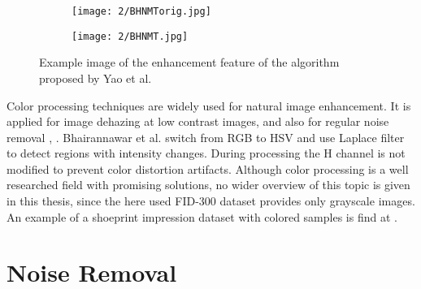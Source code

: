 \documentclass[draft,final]{vutinfth} %
\begin{document}
\begin{figure}[h]
  \centering
  \begin{subfigure}[t]{0.4\columnwidth}
    \centering
    \texttt{[image: 2/BHNMTorig.jpg]}
    \label{fig:rw:BHNMTin}
  \end{subfigure}
  \begin{subfigure}[t]{0.4\columnwidth}
    \centering
    \texttt{[image: 2/BHNMT.jpg]}
    \label{fig:rw:BHNMTout}
  \end{subfigure}
  \caption{Example image of the enhancement feature of the algorithm proposed by Yao et al. \cite{yao2016image} }
  \label{fig:rw:BHNMT} %
\end{figure}

\par
Color processing techniques are widely used for natural image enhancement.
It is applied for image dehazing at low contrast images, \cite{singh2018dehazing} and also for regular noise removal \cite{ren2018joint}, \cite{zhang2016simultaneous}. 
Bhairannawar et al. \cite{bhairannawar2017color} switch from RGB to HSV and use Laplace filter to detect regions with intensity changes. 
During processing the H channel is not modified to prevent color distortion artifacts.
Although color processing is a well researched field with promising solutions, no wider overview of this topic is given in this thesis, since the here used FID-300 dataset provides only grayscale images. 
An example of a shoeprint impression dataset with colored samples is find at \cite{katireddy2017novel}. 

\section{Noise Removal}
\end{document}
